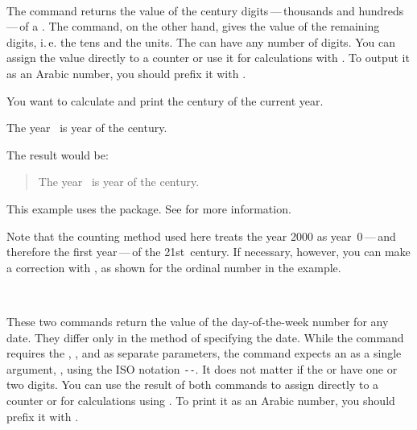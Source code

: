 \begin{Declaration}
  \\%
\end{Declaration}%
The  command returns
the value of the century digits\,---\,thousands and hundreds\,---\,of a
. The  command, on the other hand, gives the
value of the remaining digits, i.\,e. the tens and the units. The
 can have any number of digits. You can assign the value directly
to a counter or use it for calculations with
. To output it as an
Arabic number, you should prefix it with .

\begin{Example}
  You want to calculate and print the century of the current year.
\begin{lstcode}
  The year \the\year\ is year \the\DecadePart{\year}
  of the \engord{\numexpr\CenturyPart{\year}+1\relax} century.
\end{lstcode}
  The result would be:
  \begin{quote}
    The year \the\year\ is year \the\DecadePart{\year}
    of the \engordnumber{\numexpr\CenturyPart{\year}+1\relax} century.
  \end{quote}
  This example uses the  package.
  See \cite{package:engord} for more information.
\end{Example}

Note that the counting method used here treats the year
2000 as year~0\,---\,and therefore the first year\,---\,of the 21st~century.
If necessary, however, you can make a correction with , as
shown for the ordinal number in the example.%
\EndIndexGroup


\begin{Declaration}
  \\%
\end{Declaration}%
These two commands return the value of
the day-of-the-week number for any date. They differ
only in the method of specifying the date. While the  command
requires the , , and  as separate
parameters, the  command expects an  as a
single argument, , using the ISO notation
\texttt{-}\texttt{-}. It does not matter
if the  or  have one or two digits. You can use the
result of both commands to assign directly to a counter or for calculations
using . To print it as
an Arabic number, you should prefix it with .

